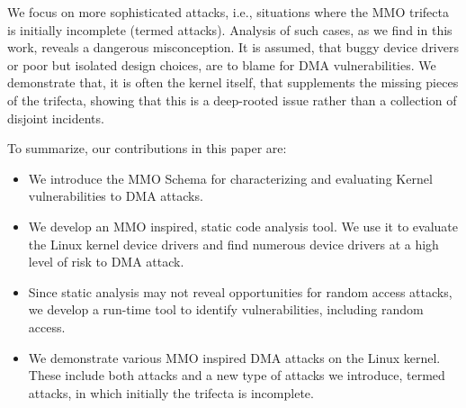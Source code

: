 We focus on more sophisticated attacks, i.e., situations where the MMO trifecta is initially incomplete (termed \compound attacks).
Analysis of such cases, as we find in this work, reveals a dangerous misconception. It is assumed, that buggy device drivers or poor but isolated design choices, are to blame for DMA vulnerabilities. 
We demonstrate that, it is often the kernel itself, that supplements the missing pieces of the trifecta, showing that this is a deep-rooted issue rather than a collection of disjoint incidents.

%
To summarize, our contributions in this paper are:
\begin{itemize}
    \item We introduce the MMO Schema for characterizing and evaluating Kernel vulnerabilities to DMA attacks.
    \item We develop an MMO inspired, static code analysis tool. We use it to evaluate the Linux kernel device drivers and find numerous device drivers at a high level of risk to DMA attack.
    \item Since static analysis may not reveal opportunities for random access attacks, we develop a run-time tool to identify \subpage{} vulnerabilities, including random access.
    \item We demonstrate various MMO inspired DMA attacks on the Linux kernel. These include both \simple{} attacks and a new type of attacks we introduce, termed \compound{} attacks, in which initially the trifecta is incomplete. 
\end{itemize}





